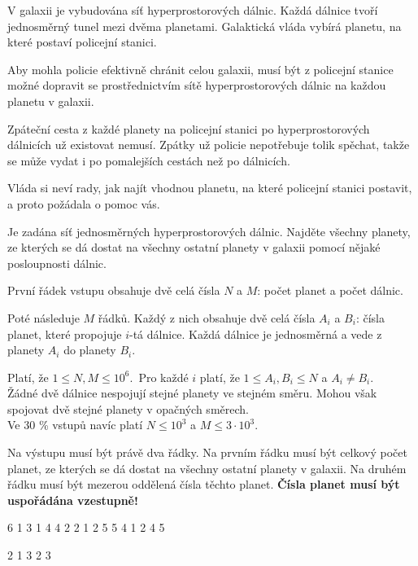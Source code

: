 
\usepackage[czech]{babel}





V galaxii je vybudována síť hyperprostorových dálnic. Každá dálnice tvoří
jednosměrný tunel mezi dvěma planetami. Galaktická vláda vybírá planetu, na
které postaví policejní stanici.

Aby mohla policie efektivně chránit celou galaxii, musí být z policejní stanice
možné dopravit se prostřednictvím sítě hyperprostorových dálnic na každou
planetu v galaxii.

Zpáteční cesta z každé planety na policejní stanici po hyperprostorových
dálnicích už existovat nemusí. Zpátky už policie nepotřebuje tolik spěchat,
takže se může vydat i po pomalejších cestách než po dálnicích.

Vláda si neví rady, jak najít vhodnou planetu, na které policejní stanici
postavit, a proto požádala o pomoc vás.


Je zadána síť jednosměrných hyperprostorových dálnic. Najděte všechny planety,
ze kterých se dá dostat na všechny ostatní planety v galaxii pomocí nějaké
posloupnosti dálnic.


První řádek vstupu obsahuje dvě celá čísla $N$ a $M$: počet planet a počet
dálnic.

Poté následuje $M$ řádků. Každý z nich obsahuje dvě celá čísla $A_i$ a $B_i$:
čísla planet, které propojuje $i$-tá dálnice. Každá dálnice je jednosměrná a
vede z planety $A_i$ do planety $B_i$.

\bigskip
\noindent
Platí, že $1 \leq N, M \leq 10^6$.\
Pro každé $i$ platí, že $1 \leq A_i, B_i \leq N$ a $A_i \neq B_i$.\\
Žádné dvě dálnice nespojují stejné planety ve stejném směru. Mohou však spojovat
  dvě stejné planety v opačných směrech.\\
Ve 30 \% vstupů navíc platí $N \leq 10^3$ a $M \leq 3 \cdot 10^3$.


Na výstupu musí být právě dva řádky. Na prvním řádku musí být celkový počet
planet, ze kterých se dá dostat na všechny ostatní planety v galaxii. Na druhém
řádku musí být mezerou oddělená čísla těchto planet. \textbf{Čísla planet musí
být uspořádána vzestupně!}


 6
1 3
1 4
4 2
2 1
2 5
5 4
1 2 4 5
\sampleEND

 2
1 3
2 3
~
\sampleEND


